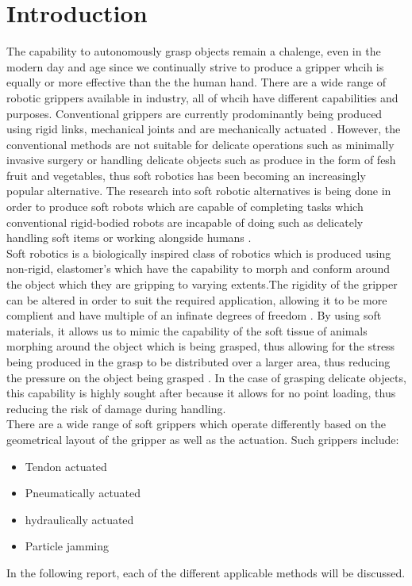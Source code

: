 \documentclass[11pt]{article}
\begin{document}
\section{Introduction}
The capability to autonomously grasp objects remain a chalenge, even in the modern day and age since we continually strive to produce a gripper whcih is equally or more effective than the the human hand. There are a wide range of robotic grippers available in industry, all of whcih have different capabilities and purposes. Conventional grippers are currently prodominantly being produced using rigid links, mechanical joints and are mechanically actuated \cite{ilievski2011soft}. However, the conventional methods are not suitable for delicate operations such as minimally invasive surgery or handling delicate objects such as produce in the form of fesh fruit and vegetables, thus soft robotics has been becoming an increasingly popular alternative. The research into soft robotic alternatives is being done in order to produce soft robots which are capable of completing tasks which conventional rigid-bodied robots are incapable of doing such as delicately handling soft items or working alongside humans \cite{bilodeau2015monolithic}.
\\
\newline
Soft robotics is a biologically inspired class of robotics which is produced using non-rigid, elastomer's which have the capability to morph and conform around the object which they are gripping to varying extents\cite{ilievski2011soft,bilodeau2015monolithic,mosadegh2014pneumatic,martinez2013robotic,marchese2015recipe}.The rigidity of the gripper can be altered in order to suit the required application, allowing it to be more complient and have multiple of an infinate degrees of freedom \cite{hassan2015design}. By using soft materials, it allows us to mimic the capability of the soft tissue of animals morphing around the object which is being grasped, thus allowing for the stress being produced in the grasp to be distributed over a larger area, thus reducing the pressure on the object being grasped \cite{ilievski2011soft}. In the case of grasping delicate objects, this capability is highly sought after because it allows for no point loading, thus reducing the risk of damage  during handling.
\\
\newline
There are a wide range of soft grippers which operate differently based on the geometrical layout of the gripper as well as the actuation. Such grippers include:
\begin{itemize}
\item Tendon actuated
\item Pneumatically actuated
\item hydraulically actuated
\item Particle jamming
\end{itemize}
In the following report, each of the different applicable methods will be discussed.
\end{document}
